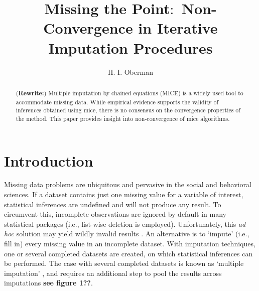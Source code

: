\documentclass[Royal,times,sageh]{sagej}
\begin{document}
\title{Missing the Point\(\colon\) Non-Convergence in Iterative Imputation
Procedures}


\author{H. I. Oberman}




\begin{abstract}
(\textbf{Rewrite:}) Multiple imputation by chained equations (MICE) is a
widely used tool to accommodate missing data. While empirical evidence
supports the validity of inferences obtained using mice, there is no
consensus on the convergence properties of the method. This paper
provides insight into non-convergence of mice algorithms.
\end{abstract}


\maketitle

\hypertarget{introduction}{%
\section{Introduction}\label{introduction}}

Missing data problems are ubiquitous and pervasive in the social and
behavioral sciences. If a dataset contains just one missing value for a
variable of interest, statistical inferences are undefined and will not
produce any result. To circumvent this, incomplete observations are
ignored by default in many statistical packages (i.e., list-wise
deletion is employed). Unfortunately, this \emph{ad hoc} solution may
yield wildly invalid results \citep{buur18}. An alternative is to
`impute' (i.e., fill in) every missing value in an incomplete dataset.
With imputation techniques, one or several completed datasets are
created, on which statistical inferences can be performed. The case with
several completed datasets is known as `multiple imputation'
\citep[MI;][]{rubin76}, and requires an additional step to pool the
results across imputations \textbf{see figure 1??}.
\end{document}
